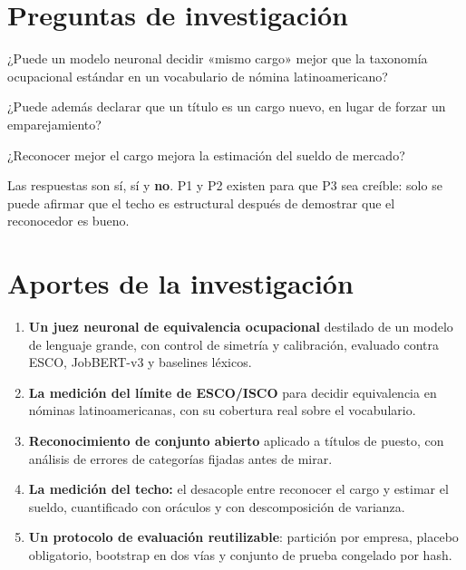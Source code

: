 \documentclass[12pt,a4paper,oneside]{report}
\begin{document}
\section{Preguntas de investigación}

\begin{description}[leftmargin=2.2em,style=nextline]
  \item[P1] ¿Puede un modelo neuronal decidir «mismo cargo» mejor que la taxonomía
    ocupacional estándar en un vocabulario de nómina latinoamericano?
  \item[P2] ¿Puede además declarar que un título es un cargo nuevo, en lugar de forzar un
    emparejamiento?
  \item[P3] ¿Reconocer mejor el cargo mejora la estimación del sueldo de mercado?
\end{description}

Las respuestas son sí, sí y \textbf{no}. P1 y P2 existen para que P3 sea creíble: solo se
puede afirmar que el techo es estructural después de demostrar que el reconocedor es bueno.

\section{Aportes de la investigación}

\begin{enumerate}[leftmargin=2em]
  \item \textbf{Un juez neuronal de equivalencia ocupacional} destilado de un modelo de
    lenguaje grande, con control de simetría y calibración, evaluado contra ESCO,
    JobBERT-v3 y baselines léxicos.
  \item \textbf{La medición del límite de ESCO/ISCO} para decidir equivalencia en nóminas
    latinoamericanas, con su cobertura real sobre el vocabulario.
  \item \textbf{Reconocimiento de conjunto abierto} aplicado a títulos de puesto, con
    análisis de errores de categorías fijadas antes de mirar.
  \item \textbf{La medición del techo:} el desacople entre reconocer el cargo y estimar el
    sueldo, cuantificado con oráculos y con descomposición de varianza.
  \item \textbf{Un protocolo de evaluación reutilizable}: partición por empresa, placebo
    obligatorio, bootstrap en dos vías y conjunto de prueba congelado por hash.
\end{enumerate}

\end{document}
